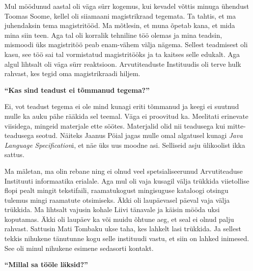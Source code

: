Mul möödunud aastal  oli väga sürr kogemus, kui kevadel võttis minuga ühendust Toomas Soome, kellel oli siiamaani magistrikraad tegemata. Ta tahtis, et ma juhendaksin tema magistritööd. Ma mõtlesin, et muna õpetab kana, et mida mina siin teen. Aga tal oli korralik tehniline töö olemas ja mina teadsin, mismoodi üks magistritöö peab enam-vähem välja nägema. Sellest teadmisest oli kasu, see töö sai tal vormistatud magistritööks ja ta kaitses selle edukalt. Aga algul lihtsalt oli väga sürr reaktsioon. Arvutiteaduste Instituudis oli terve hulk rahvast, kes tegid oma magistrikraadi hiljem.

\textbf{\enquote{Kas sind teadust ei tõmmanud tegema?}} 

Ei, vot teadust tegema ei ole mind kunagi eriti tõmmanud ja keegi ei suutnud mulle ka auku pähe rääkida sel teemal. Väga ei proovitud ka. Meelitati erinevate viisidega, mingeid materjale ette söötes. Materjalid olid nii teadusega kui mitte-teadusega seotud. Näiteks Jaanus Pöial jagas mulle omal algatusel kunagi \emph{Java Language Specification}i, et näe üks uus moodne asi. Selliseid asju ülikoolist ikka sattus. 

Ma mäletan, ma olin rebane ning ei olnud veel spetsialiseerunud Arvutiteaduse Instituuti informaatika erialale. Aga mul oli vaja kusagil välja trükkida viietollise flopi pealt mingit tekstifaili, raamatukogust mingisuguse kataloogi otsingu tulemus mingi raamatute otsimiseks. Äkki oli laupäevasel päeval vaja välja trükkida. Ma lihtsalt vajusin kohale Liivi tänavale ja käisin mööda uksi koputamas. Äkki oli laupäev ka või muidu õhtune aeg, et seal ei olnud palju rahvast. Sattusin Mati Tombaku ukse taha, kes lahkelt lasi trükkida. Ja sellest tekkis nihukene tänutunne kogu selle instituudi vastu, et siin on lahked inimesed. See oli minul nihukene esimene sedasorti kontakt. 

\textbf{\enquote{Millal sa tööle läksid?}} 	

